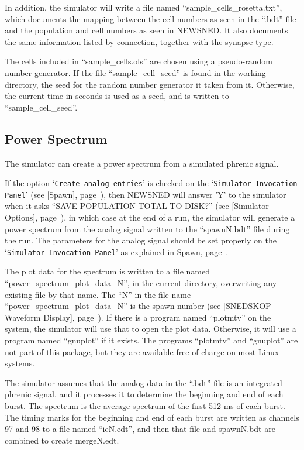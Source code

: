 \documentclass[12pt,openany,oneside]{book}
\newcommand{\tisamp}[1]{`\texttt{#1}'}
\newcommand{\tiref}[1]{#1, page~\pageref{#1}}
\newcommand{\tipxref}[1]{see [#1], page~\pageref{#1}}
\begin{document}
In addition, the simulator will write a file named
``sample\_cells\_rosetta.txt'', which documents the mapping between the
cell numbers as seen in the ``.bdt'' file and the population and cell
numbers as seen in NEWSNED.  It also documents the same information
listed by connection, together with the synapse type.

The cells included in ``sample\_cells.ols'' are chosen using a
pseudo-random number generator.  If the file ``sample\_cell\_seed'' is
found in the working directory, the seed for the random number
generator it taken from it.  Otherwise, the current time in seconds is
used as a seed, and is written to ``sample\_cell\_seed''.

\subsection{Power Spectrum}
\label{Power Spectrum}

The simulator can create a power spectrum from a simulated phrenic
signal.

If the option \tisamp{Create analog entries} is checked on the \tisamp{Simulator
Invocation Panel} (\tipxref{Spawn}), then NEWSNED will answer 'Y' to the
simulator when it asks ``SAVE POPULATION TOTAL TO DISK?''
(\tipxref{Simulator Options}), in which case at the end of a run, the
simulator will generate a power spectrum from the analog signal
written to the ``spawnN.bdt'' file during the run.  The parameters for the
analog signal should be set properly on the \tisamp{Simulator Invocation
Panel} as explained in \tiref{Spawn}.

The plot data for the spectrum is written to a file named
``power\_spectrum\_plot\_data\_N'', in the current directory, overwriting
any existing file by that name. The ``N'' in the file name
``power\_spectrum\_plot\_data\_N'' is the spawn number (\tipxref{SNEDSKOP Waveform Display}).
If there is a program named ``plotmtv'' on the
system, the simulator will use that to open the plot data.  Otherwise,
it will use a program named ``gnuplot'' if it exists.  The programs
``plotmtv'' and ``gnuplot'' are not part of this package, but they are
available free of charge on most Linux systems.

The simulator assumes that the analog data in the ``.bdt'' file is an
integrated phrenic signal, and it processes it to determine the
beginning and end of each burst.  The spectrum is the average spectrum
of the first 512 ms of each burst.  The timing marks for the beginning
and end of each burst are written as channels 97 and 98 to a file
named ``ieN.edt'', and then that file and spawnN.bdt are combined to
create mergeN.edt.
\end{document}
